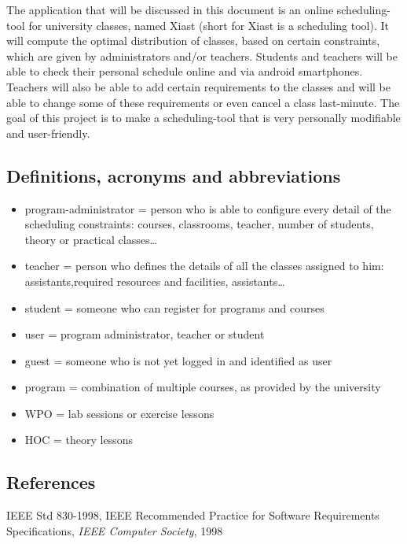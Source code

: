 \documentclass[12pt]{article}
\begin{document}
The application that will be discussed in this document is an online
scheduling-tool for university classes, named Xiast (short for Xiast is
a scheduling tool). It will compute the optimal distribution of classes,
based on certain constraints, which are given by administrators and/or
teachers. Students and teachers will be able to check their personal
schedule online and via android smartphones. Teachers will also be able
to add certain requirements to the classes and will be able to change
some of these requirements or even cancel a class last-minute. The goal
of this project is to make a scheduling-tool that is very personally
modifiable and user-friendly.

\subsection{Definitions, acronyms and
abbreviations}\label{definitions-acronyms-and-abbreviations}

\begin{itemize}
\itemsep1pt\parskip0pt
\item
  program-administrator = person who is able to configure every detail
  of the scheduling constraints: courses, classrooms, teacher, number of
  students, theory or practical classes\ldots{}
\item
  teacher = person who defines the details of all the classes assigned
  to him: assistants,required resources and facilities,
  assistants\ldots{}
\item
  student = someone who can register for programs and courses
\item
  user = program administrator, teacher or student
\item
  guest = someone who is not yet logged in and identified as user
\item
  program = combination of multiple courses, as provided by the
  university
\item
  WPO = lab sessions or exercise lessons
\item
  HOC = theory lessons
\end{itemize}

\subsection{References}\label{references}

IEEE Std 830-1998, IEEE Recommended Practice for Software Requirements
Specifications, \emph{IEEE Computer Society}, 1998
\end{document}
